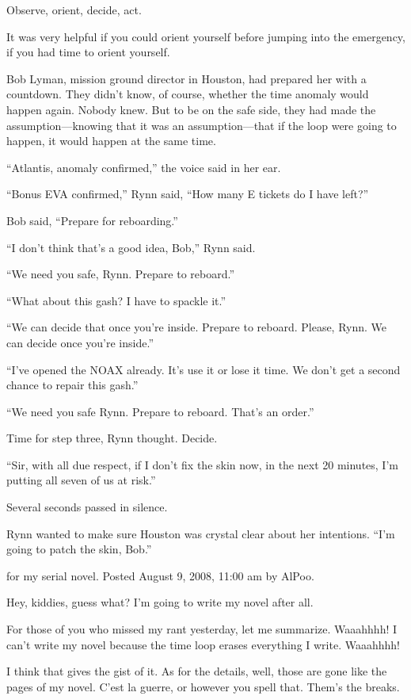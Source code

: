 Observe, orient, decide, act.

It was very helpful if you could orient yourself before jumping into the emergency, if you had time to orient yourself.

Bob Lyman, mission ground director in Houston, had prepared her with a countdown. They didn't know, of course, whether the time anomaly would happen again. Nobody knew. But to be on the safe side, they had made the assumption—knowing that it was an assumption—that if the loop were going to happen, it would happen at the same time.

``Atlantis, anomaly confirmed,'' the voice said in her ear.

``Bonus EVA confirmed,'' Rynn said, ``How many E tickets do I have left?''

Bob said, ``Prepare for reboarding.''

``I don't think that's a good idea, Bob,'' Rynn said.

``We need you safe, Rynn. Prepare to reboard.''

``What about this gash? I have to spackle it.''

``We can decide that once you're inside. Prepare to reboard. Please, Rynn. We can decide once you're inside.''

``I've opened the NOAX already. It's use it or lose it time. We don't get a second chance to repair this gash.''

``We need you safe Rynn. Prepare to reboard. That's an order.''

Time for step three, Rynn thought. Decide.

``Sir, with all due respect, if I don't fix the skin now, in the next 20 minutes, I'm putting all seven of us at risk.''

Several seconds passed in silence.

Rynn wanted to make sure Houston was crystal clear about her intentions. ``I'm going to patch the skin, Bob.''




 for my serial novel. Posted August 9, 2008, 11:00 am by AlPoo.

Hey, kiddies, guess what? I'm going to write my novel after all.

For those of you who missed my rant yesterday, let me summarize. Waaahhhh! I can't write my novel because the time loop erases everything I write. Waaahhhh!

I think that gives the gist of it. As for the details, well, those are gone like the pages of my novel. C'est la guerre, or however you spell that. Them's the breaks.

